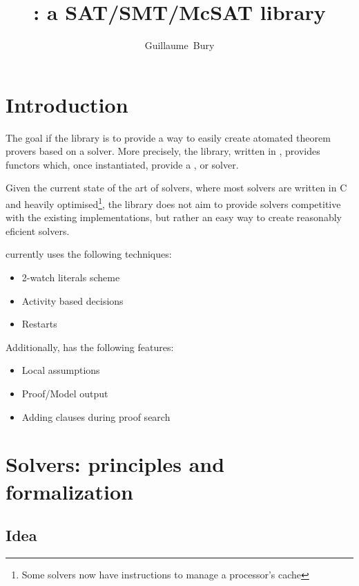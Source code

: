 \documentclass{article}
\begin{document}
\title{\msat{}: a SAT/SMT/McSAT library}
\author{Guillaume~Bury}

\maketitle

\section{Introduction}

The goal if the \msat{} library is to provide a way to easily
create atomated theorem provers based on a \sat{} solver. More precisely,
the library, written in \ocaml{}, provides functors which, once instantiated,
provide a \sat{}, \smt{} or \mcsat{} solver.

Given the current state of the art of \smt{} solvers, where most \sat{} solvers
are written in C and heavily optimised\footnote{Some solvers now have instructions
to manage a processor's cache}, the \msat{} library does not aim to provide solvers
competitive with the existing implementations, but rather an easy way to create
reasonably eficient solvers.

\msat{} currently uses the following techniques:
\begin{itemize}
  \item 2-watch literals scheme
  \item Activity based decisions
  \item Restarts
\end{itemize}

Additionally, \msat{} has the following features:
\begin{itemize}
  \item Local assumptions
  \item Proof/Model output
  \item Adding clauses during proof search
\end{itemize}

\clearpage

\tableofcontents{}

\clearpage

\section{\sat{} Solvers: principles and formalization}

\subsection{Idea}
\end{document}
